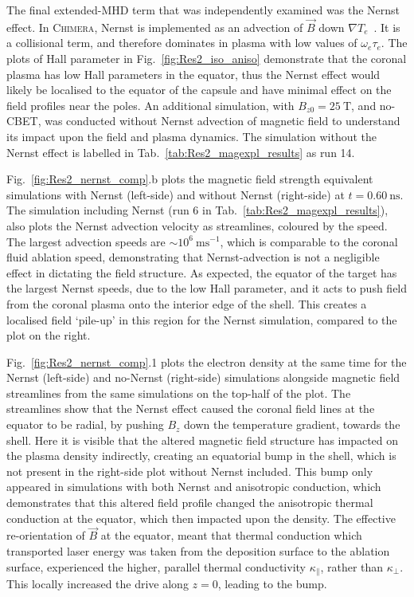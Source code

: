 The final extended-\ac{MHD} term that was independently examined was the Nernst effect.
In \textsc{Chimera}, Nernst is implemented as an advection of $\vec{B}$ down $\nabla T_e$~\cite{walsh_extended-magnetohydrodynamics_2020}.
It is a collisional term, and therefore dominates in plasma with low values of $\omega_e\tau_e$.
The plots of Hall parameter in Fig.~\ref{fig:Res2_iso_aniso} demonstrate that the coronal plasma has low Hall parameters in the equator, thus the Nernst effect would likely be localised to the equator of the capsule and have minimal effect on the field profiles near the poles.
An additional simulation, with $B_{z0}=25\ \text{T}$, and no-\ac{CBET}, was conducted without Nernst advection of magnetic field to understand its impact upon the field and plasma dynamics.
The simulation without the Nernst effect is labelled in Tab.~\ref{tab:Res2_magexpl_results} as run 14.

Fig.~\ref{fig:Res2_nernst_comp}.b plots the magnetic field strength equivalent simulations with Nernst (left-side) and without Nernst (right-side) at $t=0.60\ \text{ns}$.
The simulation including Nernst (run 6 in Tab.~\ref{tab:Res2_magexpl_results}), also plots the Nernst advection velocity as streamlines, coloured by the speed.
The largest advection speeds are $\sim10^6\ \text{ms}^{-1}$, which is comparable to the coronal fluid ablation speed, demonstrating that Nernst-advection is not a negligible effect in dictating the field structure.
As expected, the equator of the target has the largest Nernst speeds, due to the low Hall parameter, and it acts to push field from the coronal plasma onto the interior edge of the shell.
This creates a localised field `pile-up' in this region for the Nernst simulation, compared to the plot on the right.

Fig.~\ref{fig:Res2_nernst_comp}.1 plots the electron density at the same time for the Nernst (left-side) and no-Nernst (right-side) simulations alongside magnetic field streamlines from the same simulations on the top-half of the plot.
The streamlines show that the Nernst effect caused the coronal field lines at the equator to be radial, by pushing $B_z$ down the temperature gradient, towards the shell.
Here it is visible that the altered magnetic field structure has impacted on the plasma density indirectly, creating an equatorial bump in the shell, which is not present in the right-side plot without Nernst included.
This bump only appeared in simulations with both Nernst and anisotropic conduction, which demonstrates that this altered field profile changed the anisotropic thermal conduction at the equator, which then impacted upon the density.
The effective re-orientation of $\vec{B}$ at the equator, meant that thermal conduction which transported laser energy was taken from the deposition surface to the ablation surface, experienced the higher, parallel thermal conductivity $\kappa_{\parallel}$, rather than $\kappa_{\perp}$.
This locally increased the drive along $z=0$, leading to the bump.


